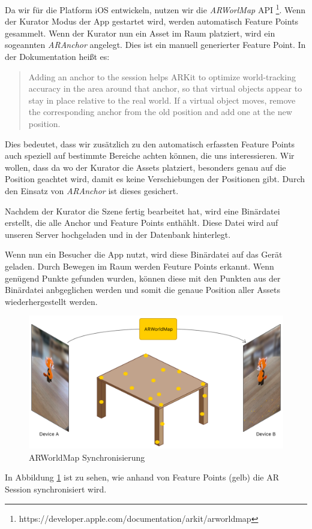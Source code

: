 \documentclass[titlepage, a4paper, 11pt]{scrartcl}
\begin{document}
  Da wir für die Platform iOS entwickeln, nutzen wir die \textit{ARWorlMap} API \footnote{https://developer.apple.com/documentation/arkit/arworldmap}.
  Wenn der Kurator Modus der App gestartet wird, werden automatisch Feature Points gesammelt.
  Wenn der Kurator nun ein Asset im Raum platziert, wird ein sogeannten \textit{ARAnchor} angelegt. Dies ist ein manuell generierter Feature Point.
  In der Dokumentation heißt es: 
  \begin{quote}
    Adding an anchor to the session helps ARKit to optimize world-tracking accuracy in the area around that anchor, so that virtual objects appear to stay in place relative to the real world. If a virtual object moves, remove the corresponding anchor from the old position and add one at the new position.
  \end{quote}
  Dies bedeutet, dass wir zusätzlich zu den automatisch erfassten Feature Points auch speziell auf bestimmte Bereiche achten können, die uns interessieren.
  Wir wollen, dass da wo der Kurator die Assets platziert, besonders genau auf die Position geachtet wird, damit es keine Verschiebungen der Positionen gibt.
  Durch den Einsatz von \textit{ARAnchor} ist dieses gesichert.

  Nachdem der Kurator die Szene fertig bearbeitet hat, wird eine Binärdatei erstellt, die alle Anchor und Feature Points enthählt.
  Diese Datei wird auf unseren Server hochgeladen und in der Datenbank hinterlegt.

  Wenn nun ein Besucher die App nutzt, wird diese Binärdatei auf das Gerät geladen.
  Durch Bewegen im Raum werden Feuture Points erkannt. Wenn genügend Punkte gefunden wurden, können diese mit den Punkten aus der Binärdatei anbgeglichen werden und somit die genaue Position aller Assets wiederhergestellt werden.


  \begin{figure}[h]
    \centering
    \includegraphics[width=.5\textwidth]{ar-world-map}
    \caption{ARWorldMap Synchronisierung}
    \label{ARWorldMap}
  \end{figure}

  In Abbildung \ref{ARWorldMap} ist zu sehen, wie anhand von Feature Points (gelb) die AR Session synchronisiert wird.
\end{document}
